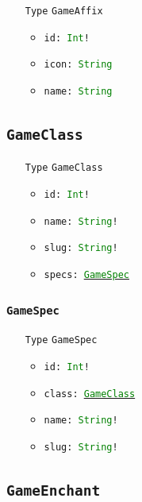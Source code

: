 \documentclass[10pt, a4paper]{memoir}
\numberwithin{equation}{section}
\theoremstyle{plain}
\theoremstyle{defp}
\theoremstyle{dotless}
\theoremstyle{definition}
\theoremstyle{dotless}
\theoremstyle{dotless}
\theoremstyle{defp}
\theoremstyle{defp}
\theoremstyle{be}          %
\theoremstyle{defp}
\newcommand\ttt[1]{\texttt{#1}}
\newcommand\type[1]{\ttt{\textcolor{green}{#1}}}
\begin{document}
\begin{itemize}[noitemsep,topsep=1pt]
\item[\ttt{Type}] \ttt{GameAffix}
\begin{itemize}[itemsep=1pt,topsep=1pt]
\item \ttt{id: \type{Int}!}
\item \ttt{icon: \type{String}}
\item \ttt{name: \type{String}}
\end{itemize}
\end{itemize}

\subsection{\ttt{GameClass}}\label{sec:GameClass}

\begin{itemize}[noitemsep,topsep=1pt]
\item[\ttt{Type}] \ttt{GameClass}
\begin{itemize}[itemsep=1pt,topsep=1pt]
\item \ttt{id: \type{Int}!}
\item \ttt{name: \type{String}!}
\item \ttt{slug: \type{String}!}
\item \ttt{specs: \hyperref[sec:GameSpec]{\type{GameSpec}}}
\end{itemize}
\end{itemize}

\subsubsection{\ttt{GameSpec}}\label{sec:GameSpec}

\begin{itemize}[noitemsep,topsep=1pt]
\item[\ttt{Type}] \ttt{GameSpec}
\begin{itemize}[itemsep=1pt,topsep=1pt]
\item \ttt{id: \type{Int}!}
\item \ttt{class: \hyperref[sec:GameClass]{\type{GameClass}}}
\item \ttt{name: \type{String}!}
\item \ttt{slug: \type{String}!}
\end{itemize}
\end{itemize}

\subsection{\ttt{GameEnchant}}\label{sec:GameEnchant}
\end{document}
